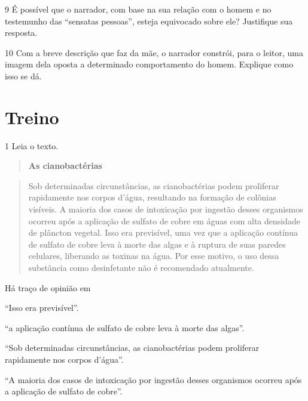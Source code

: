 \num{9} É possível que o narrador, com base na sua relação com o homem e
no testemunho das ``sensatas pessoas'', esteja equivocado sobre ele?
Justifique sua resposta.


\num{10} Com a breve descrição que faz da mãe, o narrador constrói, para
o leitor, uma imagem dela oposta a determinado comportamento do homem.
Explique como isso se dá.


\section{Treino}

\num{1} Leia o texto.

\begin{quote}
\centering\textbf{As cianobactérias}
\end{quote}


\begin{quote}
Sob determinadas circunstâncias, as cianobactérias podem proliferar
rapidamente nos corpos d'água, resultando na formação de colônias
visíveis. A maioria dos casos de intoxicação por ingestão desses
organismos ocorreu após a aplicação de sulfato de cobre em águas com
alta densidade de plâncton vegetal. Isso era previsível, uma vez que a
aplicação contínua de sulfato de cobre leva à morte das algas e à
ruptura de suas paredes celulares, liberando as toxinas na água. Por
esse motivo, o uso dessa substância como desinfetante não é recomendado
atualmente.
\end{quote}


Há traço de opinião em

\begin{escolha}

\item ``Isso era previsível''.

\item ``a aplicação contínua de sulfato de cobre leva à morte das algas''.

\item ``Sob determinadas circunstâncias, as cianobactérias podem proliferar
rapidamente nos corpos d'água''.

\item ``A maioria dos casos de intoxicação por ingestão desses organismos
ocorreu após a aplicação de sulfato de cobre''.
\end{escolha}

